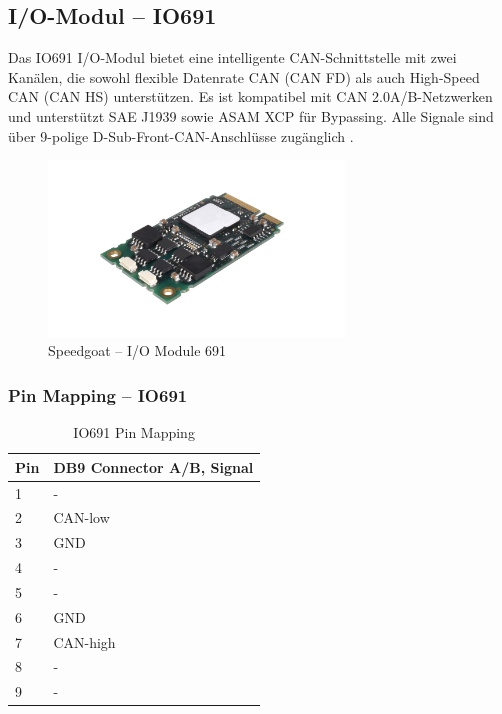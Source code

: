 \subsection{I/O-Modul – IO691}
\label{section:IO691}

Das IO691 I/O-Modul bietet eine intelligente CAN-Schnittstelle mit zwei Kanälen, die sowohl flexible Datenrate CAN (CAN FD) als auch High-Speed CAN (CAN HS) unterstützen. Es ist kompatibel mit CAN 2.0A/B-Netzwerken und unterstützt SAE J1939 sowie ASAM XCP für Bypassing. Alle Signale sind über 9-polige D-Sub-Front-CAN-Anschlüsse zugänglich \cite{speedgoat:IO691}.

\pagebreak[1]
\begin{figure}[!ht]
	\begin{center}
		\includegraphics[width=0.7\textwidth]{img/2_steuerung/goat_io691.png}
		\caption{Speedgoat – I/O Module 691 \cite{speedgoat:IO691}}
		\label{img_2_2:goat:IO691}
	\end{center}
\end{figure}
\pagebreak[4]




\subsubsection{Pin Mapping –  IO691}

\pagebreak[1]
\begin{table}[!ht]
	\centering
	\caption{IO691 Pin Mapping}
	\label{speedgoat:IO691}
	\begin{tabular}{ll}
		\hline
		\textbf{Pin}           & \textbf{DB9 Connector A/B, Signal} \\ \hline
		\multicolumn{1}{l|}{1} & -                                  \\
		\multicolumn{1}{l|}{2} & CAN-low                            \\
		\multicolumn{1}{l|}{3} & GND                                \\
		\multicolumn{1}{l|}{4} & -                                  \\
		\multicolumn{1}{l|}{5} & -                                  \\
		\multicolumn{1}{l|}{6} & GND                                \\
		\multicolumn{1}{l|}{7} & CAN-high                           \\
		\multicolumn{1}{l|}{8} & -                                  \\
		\multicolumn{1}{l|}{9} & -                                  \\ \hline
	\end{tabular}
\end{table}
\pagebreak[4]


